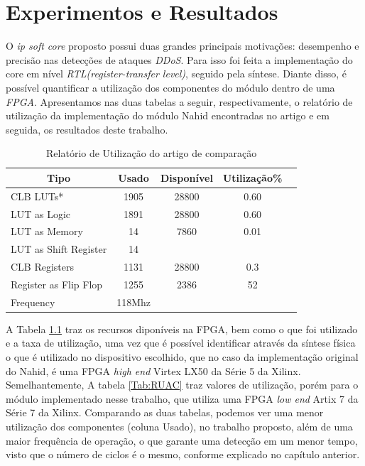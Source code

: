 \chapter[Resultados]{Experimentos e Resultados}
\label{resultados}
O \textit{ip soft core} proposto possui duas grandes principais motivações: desempenho e precisão nas detecções de ataques \textit{DDoS}. Para isso foi feita a implementação do core em nível \textit{RTL(register-transfer level)}, seguido pela síntese. Diante disso, é possível quantificar a utilização dos componentes do módulo dentro de uma \textit{FPGA}. Apresentamos nas duas tabelas a seguir, respectivamente, o relatório de utilização da implementação do módulo Nahid encontradas no  artigo \cite{HOQUE201748} e em seguida, os resultados deste trabalho. 
\begin{table}[!htb]
	\centering
	\caption{Relatório de Utilização do artigo de comparação}
	\label{Tab:RUP}
	\begin{tabular}{lcccc}
		\hline
		\multicolumn{1}{c}{Tipo}&\multicolumn{1}{c}{Usado }&\multicolumn{1}{c}{Disponível}&\multicolumn{1}{c}{Utilização\%} \\ \midrule 
		
		CLB LUTs*&  1905  & 28800 & 0.60  \\   \midrule
		LUT as Logic & 1891  & 28800 &  0.60  \\  \midrule
		LUT as Memory &  14  & 7860 &  0.01  \\  \midrule
		LUT as Shift Register & 14  &  &   \\  \midrule
		CLB Registers  & 1131  & 28800 & 0.3  \\  \midrule
		Register as Flip Flop & 1255  & 2386  & 52    \\  \midrule
		Frequency &  118Mhz 
	\end{tabular}
\end{table}

A Tabela \ref{Tab:RUP} traz os recursos diponíveis na FPGA, bem como o que foi utilizado e a taxa de utilização, uma vez que é possível identificar através da síntese física o que é utilizado no dispositivo escolhido, que no caso da implementação original do Nahid, é uma FPGA \textit{high end} Virtex LX50 da Série 5 da Xilinx. Semelhantemente, A tabela \ref{Tab:RUAC} traz valores de utilização, porém para o módulo implementado nesse trabalho, que utiliza uma FPGA \textit{low end} Artix 7 da Série 7 da Xilinx. Comparando as duas tabelas, podemos ver uma menor utilização dos componentes (coluna Usado), no trabalho proposto, além de uma maior frequência de operação, o que garante uma detecção em um menor tempo, visto que o número de ciclos é o mesmo, conforme explicado no capítulo anterior.


